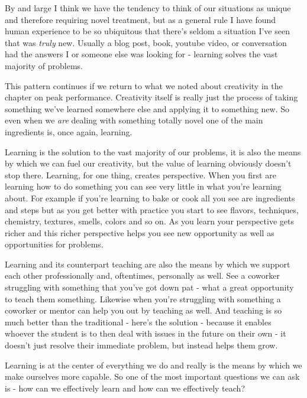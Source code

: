 \documentclass[11pt,a5paper]{book}
\begin{document}
By and large I think we have the tendency to think of our situations as unique and therefore requiring novel treatment, but as a general rule I have found human experience to be so ubiquitous that there's seldom a situation I've seen that was \textit{truly} new. Usually a blog post, book, youtube video, or conversation had the answers I or someone else was looking for - learning solves the vast majority of problems.
\newline

This pattern continues if we return to what we noted about creativity in the chapter on peak performance. Creativity itself is really just the process of taking something we've learned somewhere else and applying it to something new. So even when we \textit{are} dealing with something totally novel one of the main ingredients is, once again, learning.  
\newline

Learning is the solution to the vast majority of our problems, it is also the means by which we can fuel our creativity, but the value of learning obviously doesn't stop there. Learning, for one thing, creates perspective. When you first are learning how to do something you can see very little in what you're learning about. For example if you're learning to bake or cook all you see are ingredients and steps but as you get better with practice you start to see flavors, techniques, chemistry, textures, smells, colors and so on. As you learn your perspective gets richer and this richer perspective helps you see new opportunity as well as opportunities for problems.
\newline

Learning and its counterpart teaching are also the means by which we support each other professionally and, oftentimes, personally as well. See a coworker struggling with something that you've got down pat - what a great opportunity to teach them something. Likewise when you're struggling with something a coworker or mentor can help you out by teaching as well. And teaching is so much better than the traditional - here's the solution - because it enables whoever the student is to then deal with issues in the future on their own - it doesn't just resolve their immediate problem, but instead helps them grow. 
\newline

Learning is at the center of everything we do and really is the means by which we make ourselves more capable. So one of the most important questions we can ask is - how can we effectively learn and how can we effectively teach? 
\end{document}
